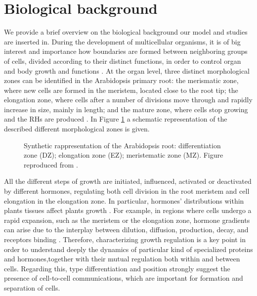 \section{Biological background} \label{sec:bio}
We provide a brief overview on the biological background our model and studies are inserted in.
During the development of multicellular organisms, it is of big interest and importance how boundaries are formed between neighboring groups of cells, divided according to their distinct functions, in order to control organ and body growth and functions \cite{Vero:4_celldivision}. At the organ level, three distinct morphological zones can  be identified in the Arabidopsis primary root: the merismatic zone, where new cells are formed in the meristem, located close to the root tip; the elongation zone, where cells after a number of divisions move through and rapidly increase in size, mainly in length; and the mature zone, where cells stop growing and the RHs are produced \cite{Vero:7_root, Vero:8_meristem}. In Figure \ref{fig:root} a schematic representation of the described different morphological zones is given.
\begin{figure}[H]
    \centering
    \quad
    \caption[Arabidopsis root scheme]{Synthetic rappresentation of the Arabidopsis root: differentiation zone (DZ); elongation zone (EZ); meristematic zone (MZ). Figure reproduced from \cite{vero:auxintrasnport, plant:Band_multi}.}
    \label{fig:root}
\end{figure}
All the different steps of growth are initiated, influenced, activated or deactivated by different hormones, regulating both cell division in the root meristem and cell elongation in the elongation zone.
In particular, hormones' distributions within plants tissues affect plants growth \cite{Vero:4_celldivision, intra2:12_GTP}. For example, in regions where cells undergo a rapid expansion, such as the meristem or the elongation zone, hormone gradients can arise due to the interplay between dilution, diffusion, production, decay, and receptors binding \cite{Vero:6_signal}.
Therefore, characterizing growth regulation is a key point in order to understand deeply the dynamics of particular kind of specialized proteins and hormones,together with their mutual regulation both within and between cells. Regarding this, type differentiation and position strongly suggest the presence of cell-to-cell communications, which are important for formation and separation of cells.


